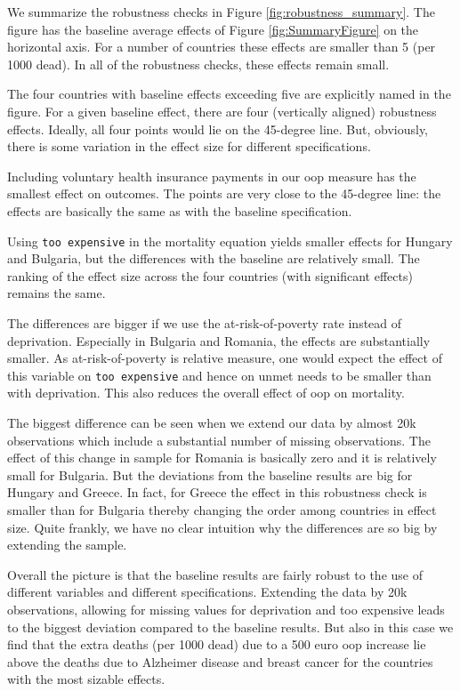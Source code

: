 \documentclass[a4paper,12pt]{article}
\begin{document}
We summarize the robustness checks in Figure \ref{fig:robustness_summary}. The figure has the baseline average effects of Figure \ref{fig:SummaryFigure} on the horizontal axis. For a number of countries these effects are smaller than 5 (per 1000 dead). In all of the robustness checks, these effects remain small.

The four countries with baseline effects exceeding five are explicitly named in the figure. For a given baseline effect, there are four (vertically aligned) robustness effects. Ideally, all four points would lie on the 45-degree line. But, obviously, there is some variation in the effect size for different specifications.

Including voluntary health insurance payments in our oop measure has the smallest effect on outcomes. The points are very close to the 45-degree line: the effects are basically the same as with the baseline specification.

Using \texttt{too expensive} in the mortality equation yields smaller effects for Hungary and Bulgaria, but the differences with the baseline are relatively small. The ranking of the effect size across the four countries (with significant effects) remains the same.

The differences are bigger if we use the at-risk-of-poverty rate instead of deprivation. Especially in Bulgaria and Romania, the effects are substantially smaller. As at-risk-of-poverty is relative measure, one would expect the effect of this variable on \texttt{too expensive} and hence on unmet needs to be smaller than with deprivation. This also reduces the overall effect of oop on mortality.

The biggest difference can be seen when we extend our data by almost 20k observations which include a substantial number of missing observations. The effect of this change in sample for Romania is basically zero and it is relatively small for Bulgaria. But the deviations from the baseline results are big for Hungary and Greece. In fact, for Greece the effect in this robustness check is smaller than for Bulgaria thereby changing the order among countries in effect size. Quite frankly, we have no clear intuition why the differences are so big by extending the sample.

Overall the picture is that the baseline results are fairly robust to the use of different variables and different specifications. Extending the data by 20k observations, allowing for missing values for deprivation and too expensive leads to the biggest deviation compared to the baseline results. But also in this case we find that the extra deaths (per 1000 dead) due to a 500 euro oop increase lie above the deaths due to Alzheimer disease and breast cancer for the countries with the most sizable effects.
\end{document}
